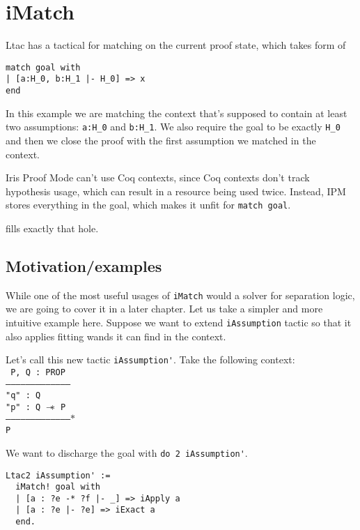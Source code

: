 \chapter{iMatch}

Ltac has a tactical for matching on the current proof state, which takes form of

\begin{lstlisting}
match goal with
| [a:H_0, b:H_1 |- H_0] => x
end
\end{lstlisting}

In this example we are matching the context that's supposed to contain at least two assumptions: \lstinline|a:H_0| and \lstinline|b:H_1|.
We also require the goal to be exactly \lstinline|H_0| and then we close the proof with the first assumption we matched in the context.\

Iris Proof Mode can't use Coq contexts, since Coq contexts don't track hypothesis usage, which can result in a resource being used twice.
Instead, IPM stores everything in the goal, which makes it unfit for \lstinline|match goal|.

\iMatch fills exactly that hole.

\section{Motivation/examples}

While one of the most useful usages of \lstinline{iMatch} would a solver for separation logic, we are going to cover it in a later chapter.
Let us take a simpler and more intuitive example here.
Suppose we want to extend \lstinline{iAssumption} tactic so that it also applies fitting wands it can find in the context.

Let's call this new tactic \lstinline{iAssumption'}.
Take the following context:\\
\texttt{
P, Q : PROP\\
---------------------------------------\\
"q" : Q\\
"p" : Q $\mathrel{-\mkern-6mu*}$ P\\
--------------------------------------$\ast$\\
P
}

We want to discharge the goal with \lstinline|do 2 iAssumption'|.

\begin{minipage}{\linewidth}
\begin{lstlisting}
Ltac2 iAssumption' :=
  iMatch! goal with
  | [a : ?e -* ?f |- _] => iApply a
  | [a : ?e |- ?e] => iExact a
  end.
\end{lstlisting}
\end{minipage}

